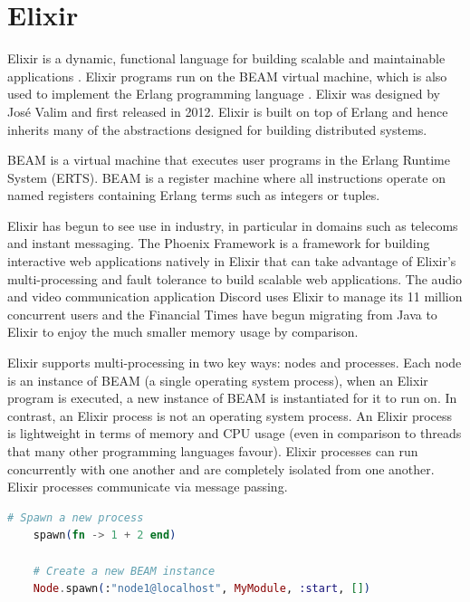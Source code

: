 \section[]{Elixir}
Elixir is a dynamic, functional language for building scalable and maintainable applications \cite{elixir}. Elixir programs run on the BEAM virtual machine\cite{beam}, which is also used to implement the Erlang programming language \cite{erlang}. Elixir was designed by José Valim and first released in 2012. Elixir is built on top of Erlang and hence inherits many of the abstractions designed for building distributed systems.
\par
BEAM is a virtual machine that executes user programs in the Erlang Runtime System (ERTS). BEAM is a register machine where all instructions operate on named registers containing Erlang terms such as integers or tuples.
\par
Elixir has begun to see use in industry, in particular in domains such as telecoms and instant messaging. The Phoenix Framework \cite{phoenix} is a framework for building interactive web applications natively in Elixir that can take advantage of Elixir's multi-processing and fault tolerance to build scalable web applications. The audio and video communication application Discord \cite{discord} uses Elixir to manage its 11 million concurrent users and the Financial Times \cite{ft} have begun migrating from Java to Elixir to enjoy the much smaller memory usage by comparison.
\par
Elixir supports multi-processing in two key ways: nodes and processes. Each node is an instance of BEAM (a single operating system process), when an Elixir program is executed, a new instance of BEAM is instantiated for it to run on. In contrast, an Elixir process is not an operating system process. An Elixir process is lightweight in terms of memory and CPU usage (even in comparison to threads that many other programming languages favour). Elixir processes can run concurrently with one another and are completely isolated from one another. Elixir processes communicate via message passing.
\begin{lstlisting}[language=Elixir, xleftmargin=.2\linewidth, caption={An example of spawn/1 and spawn/4 in Elixir for spawning a new lightweight process and a new Elixir node}]
    # Spawn a new process
    spawn(fn -> 1 + 2 end)

    # Create a new BEAM instance
    Node.spawn(:"node1@localhost", MyModule, :start, [])
\end{lstlisting}
